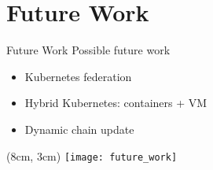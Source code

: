 \section{Future Work}
\begin{frame}{Future Work}
  Possible future work
  \begin{itemize}
  \item<1-> Kubernetes federation
  \item<2-> Hybrid Kubernetes: containers + VM
  \item<3-> Dynamic chain update
  \end{itemize}

  \begin{textblock*}{5cm}(8cm, 3cm)
    \texttt{[image: future\_work]}
  \end{textblock*}
\end{frame}
